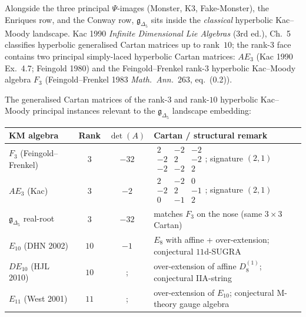 Alongside the three principal $\Psi$-images (Monster, K3, Fake-Monster),
the Enriques row, and the Conway row, $\mathfrak{g}_{\Delta_5}$ sits
inside the \emph{classical} hyperbolic Kac--Moody landscape. Kac 1990
\emph{Infinite Dimensional Lie Algebras} (3rd ed.), Ch.~5 classifies
hyperbolic generalised Cartan matrices up to rank~$10$; the rank-$3$
face contains two principal simply-laced hyperbolic Cartan matrices:
$AE_3$ (Kac 1990 Ex.~4.7; Feingold 1980) and the
Feingold--Frenkel rank-$3$ hyperbolic Kac--Moody algebra $F_3$
(Feingold--Frenkel 1983 \emph{Math.\ Ann.}~263, eq.~(0.2)).

\begin{remark}
\label{rem:bkm-drinfeld-cartan-table}
The generalised Cartan matrices of the rank-$3$ and rank-$10$
hyperbolic Kac--Moody principal instances relevant to the
$\mathfrak{g}_{\Delta_5}$ landscape embedding:
\begin{center}
\renewcommand{\arraystretch}{1.25}
\begin{tabular}{lccl}
\toprule
KM algebra & Rank & $\det(A)$ & Cartan / structural remark \\
\midrule
$F_3$ (Feingold--Frenkel) & $3$ & $-32$ &
 $\begin{smallmatrix} 2 & -2 & -2 \\ -2 & 2 & -2 \\ -2 & -2 & 2 \end{smallmatrix}$;
 signature $(2,1)$ \\
$AE_3$ (Kac) & $3$ & $-2$ &
 $\begin{smallmatrix} 2 & -2 & 0 \\ -2 & 2 & -1 \\ 0 & -1 & 2 \end{smallmatrix}$;
 signature $(2,1)$ \\
$\mathfrak{g}_{\Delta_5}$ real-root & $3$ & $-32$ &
 matches $F_3$ on the nose (same $3\times 3$ Cartan) \\
$E_{10}$ (DHN 2002) & $10$ & $-1$ &
 $E_8$ with affine + over-extension; conjectural $11$d-SUGRA \\
$DE_{10}$ (HJL 2010) & $10$ &; &
 over-extension of affine $D_8^{(1)}$; conjectural IIA-string \\
$E_{11}$ (West 2001) & $11$ &; &
 over-extension of $E_{10}$; conjectural M-theory gauge algebra \\

\end{tabular}
\end{center}
\end{remark}
